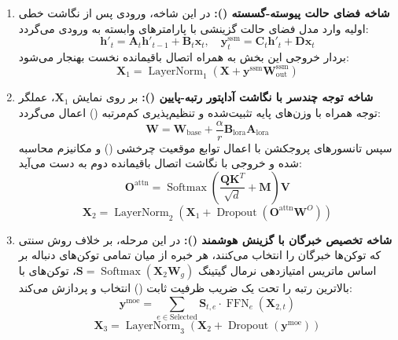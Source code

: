 \begin{enumerate}
    \item \textbf{شاخه فضای حالت پیوسته-گسسته ():}
    در این شاخه، ورودی پس از نگاشت خطی اولیه وارد مدل فضای حالت گزینشی با پارامترهای وابسته به ورودی می‌گردد:
    \begin{equation}
    \mathbf{h}'_t = \mathbf{A}_t \mathbf{h}'_{t-1} + \mathbf{B}_t \mathbf{x}_t, \quad \mathbf{y}_t^{\text{ssm}} = \mathbf{C}_t \mathbf{h}'_t + \mathbf{D} \mathbf{x}_t
    \end{equation}
    بردار خروجی این بخش به همراه اتصال باقیمانده نخست بهنجار می‌شود:
    \begin{equation}
    \mathbf{X}_1 = \operatorname{LayerNorm}_1\left(\mathbf{X} + \mathbf{y}^{\text{ssm}} \mathbf{W}_{\text{out}}^{\text{ssm}}\right)
    \end{equation}

    \item \textbf{شاخه توجه چندسر با نگاشت آداپتور رتبه-پایین ():}
    بر روی نمایش $\mathbf{X}_1$، عملگر توجه همراه با وزن‌های پایه تثبیت‌شده و تنظیم‌پذیری کم‌مرتبه () اعمال می‌گردد:
    \begin{equation}
    \mathbf{W} = \mathbf{W}_{\text{base}} + \frac{\alpha}{r} \mathbf{B}_{\text{lora}} \mathbf{A}_{\text{lora}}
    \end{equation}
    سپس تانسورهای پروجکشن با اعمال توابع موقعیت چرخشی () و مکانیزم  محاسبه شده و خروجی با نگاشت اتصال باقیمانده دوم به دست می‌آید:
    \begin{equation}
    \mathbf{O}^{\text{attn}} = \operatorname{Softmax}\left(\frac{\mathbf{Q} \mathbf{K}^T}{\sqrt{d}} + \mathbf{M}\right)\mathbf{V}
    \end{equation}
    \begin{equation}
    \mathbf{X}_2 = \operatorname{LayerNorm}_2\left(\mathbf{X}_1 + \operatorname{Dropout}\left(\mathbf{O}^{\text{attn}} \mathbf{W}^O\right)\right)
    \end{equation}

    \item \textbf{شاخه تخصیص خبرگان با گزینش هوشمند ():}
    در این مرحله، بر خلاف روش سنتی که توکن‌ها خبرگان را انتخاب می‌کنند، هر خبره از میان تمامی توکن‌های دنباله بر اساس ماتریس امتیازدهی نرمال گیتینگ $\mathbf{S} = \operatorname{Softmax}(\mathbf{X}_2 \mathbf{W}_g)$، توکن‌های با بالاترین رتبه را تحت یک ضریب ظرفیت ثابت () انتخاب و پردازش می‌کند:
    \begin{equation}
    \mathbf{y}^{\text{moe}} = \sum_{e \in \text{Selected}} \mathbf{S}_{t, e} \cdot \operatorname{FFN}_e(\mathbf{X}_{2, t})
    \end{equation}
    \begin{equation}
    \mathbf{X}_3 = \operatorname{LayerNorm}_3\left(\mathbf{X}_2 + \operatorname{Dropout}\left(\mathbf{y}^{\text{moe}}\right)\right)
    \end{equation}
\end{enumerate}

